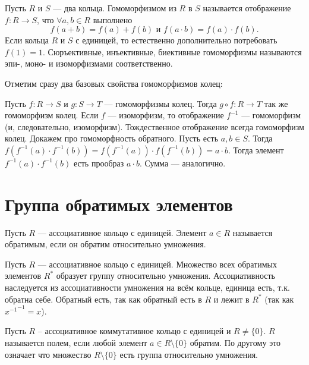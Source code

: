  Пусть $R$ и $S$ --- два кольца. Гомоморфизмом из $R$ в $S$ называется отображение $f\colon R \to S$, что
$\forall a,b \in R$ выполнено 
$$f(a+b)=f(a)+f(b)\text{  и  }f(a\cdot b)=f(a) \cdot f(b).$$
Если кольца $R$ и $S$ с единицей, то естественно дополнительно потребовать $f(1) = 1$. Сюръективные, инъективные, биективные гомоморфизмы называются эпи-, моно- и изоморфизмами соответственно.
\edfn

Отметим сразу два базовых свойства гомоморфизмов колец:

\lm Пусть $f\colon R \to S$  и $g\colon S \to T$ --- гомоморфизмы колец. Тогда $g\circ f\colon R \to T$ так же гомоморфизм
колец. Если $f$ — изоморфизм, то отображение $f^{-1}$ --- гомоморфизм (и, следовательно, изоморфизм). Тождественное отображение всегда гомоморфизм колец.
\elm
\proof Докажем про гомоморфность обратного. Пусть есть $a,b \in S$. Тогда $f(f^{-1}(a)\cdot f^{-1}(b))=f(f^{-1}(a))\cdot f(f^{-1}(b))=a\cdot b$. Тогда элемент $f^{-1}(a)\cdot f^{-1}(b)$ есть прообраз $a\cdot b$. Сумма --- аналогично.
\endproof



\section{Группа обратимых элементов}

 Пусть $R$ — ассоциативное кольцо с единицей. Элемент $a\in R$ называется обратимым, если он обратим относительно умножения.
\edfn

 Пусть $R$ --- ассоциативное кольцо с единицей. Множество всех обратимых элементов $R^*$ образует группу относительно умножения.
\elm
\proof Ассоциативность наследуется из ассоциативности умножения на всём кольце, единица есть, т.к. обратна себе. Обратный есть, так как обратный есть в $R$ и лежит в $R^*$ (так как ${x^{-1}}^{-1}=x$).
\endproof

\dfn[Поле] Пусть $R$ -- ассоциативное коммутативное кольцо с единицей и $R\neq \{0\}$. $R$ называется полем, если   любой элемент $ a\in R\setminus\{0\}$ обратим. По другому это означает что множество $R\setminus\{0\}$ есть группа относительно умножения.
\edfn





